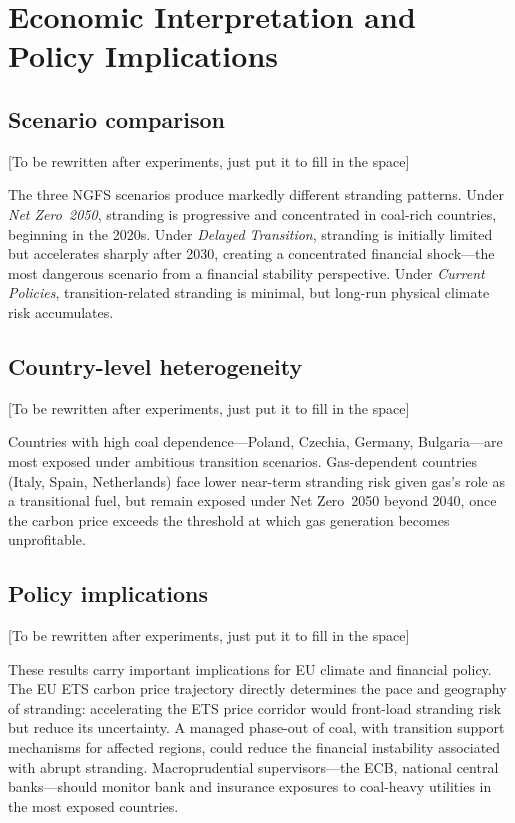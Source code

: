 \documentclass[a4paper, 12pt]{report}
\numberwithin{equation}{chapter}
\numberwithin{figure}{chapter}
\numberwithin{table}{chapter}
\begin{document}
\chapter{Economic Interpretation and Policy Implications}
\label{ch:discussion}

\section{Scenario comparison}

[To be rewritten after experiments, just put it to fill in the space]

The three NGFS scenarios produce markedly different stranding patterns. Under \textit{Net Zero~2050}, stranding is progressive and concentrated in coal-rich countries, beginning in the 2020s. Under \textit{Delayed Transition}, stranding is initially limited but accelerates sharply after 2030, creating a concentrated financial shock---the most dangerous scenario from a financial stability perspective. Under \textit{Current Policies}, transition-related stranding is minimal, but long-run physical climate risk accumulates.

\section{Country-level heterogeneity}

[To be rewritten after experiments, just put it to fill in the space]

Countries with high coal dependence---Poland, Czechia, Germany, Bulgaria---are most exposed under ambitious transition scenarios. Gas-dependent countries (Italy, Spain, Netherlands) face lower near-term stranding risk given gas's role as a transitional fuel, but remain exposed under Net Zero~2050 beyond 2040, once the carbon price exceeds the threshold at which gas generation becomes unprofitable.

\section{Policy implications}

[To be rewritten after experiments, just put it to fill in the space]

These results carry important implications for EU climate and financial policy. The EU ETS carbon price trajectory directly determines the pace and geography of stranding: accelerating the ETS price corridor would front-load stranding risk but reduce its uncertainty. A managed phase-out of coal, with transition support mechanisms for affected regions, could reduce the financial instability associated with abrupt stranding. Macroprudential supervisors---the ECB, national central banks---should monitor bank and insurance exposures to coal-heavy utilities in the most exposed countries.
\end{document}
